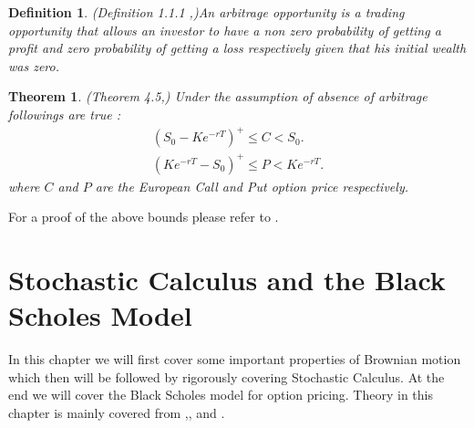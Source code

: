 \documentclass[12pt]{report}
\newtheorem{theorem}{Theorem}[section]
\newtheorem{definition}{Definition}[section]
\begin{document}
\begin{definition}{(Definition 1.1.1 ,\cite{papanicolaou_2019})}An arbitrage opportunity is a trading opportunity that allows an investor to have a non zero probability of getting a profit and zero probability of getting a loss respectively given that his initial wealth was zero.
\end{definition}


\begin{theorem}{(Theorem 4.5,\cite{campolieti_2014})}
Under the assumption of absence of arbitrage followings are true :
\begin{equation}
\begin{aligned}
    (S_0-Ke^{-rT})^+ \leq C < S_0.\\
    (Ke^{-rT}-S_0)^+ \leq P < Ke^{-rT}.
\end{aligned}
\end{equation}
where $C$ and $P$ are the European Call and Put option price respectively.
\end{theorem}
For a proof of the above bounds please refer to \cite{campolieti_2014}.



\chapter{Stochastic Calculus and the Black Scholes Model}
In this chapter we will first cover some important properties of Brownian motion which then will be followed by rigorously covering Stochastic Calculus. At the end we will cover the Black Scholes model for option pricing. Theory in this chapter is mainly covered from \cite{mikosch_2011},\cite{shreve_2011}, \cite{resnick_1992} and \cite{oksendal_2013}.  
\end{document}
